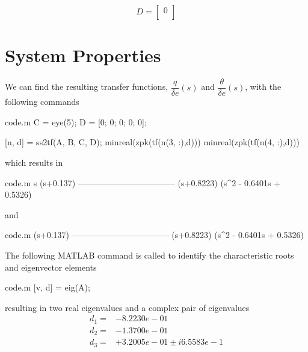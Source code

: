 \documentclass[12pt]{article}
\begin{document}
\begin{equation*}
D =
\begin{bmatrix}
 0 \\
\end{bmatrix}
\end{equation*}

\clearpage
\section{System Properties}

\noindent We can find the resulting transfer functions, $\dfrac{q}{\delta e} (s)$ and $\dfrac{\theta}{\delta e} (s)$, with the following commands \\

\begin{filecontents*}{code.m}
C = eye(5);
D = [0; 0; 0; 0; 0];

[n, d] = ss2tf(A, B, C, D);
minreal(zpk(tf(n(3, :),d))) %
minreal(zpk(tf(n(4, :),d))) %
\end{filecontents*}


\noindent which results in
\begin{filecontents*}{code.m}
              s (s+0.137)
  -----------------------------------
  (s+0.8223) (s^2 - 0.6401s + 0.5326)
\end{filecontents*}

and
\begin{filecontents*}{code.m}
               (s+0.137)
  -----------------------------------
  (s+0.8223) (s^2 - 0.6401s + 0.5326)
 
\end{filecontents*}


\noindent The following MATLAB command is called to identify the characteristic roots and eigenvector elements
\begin{filecontents*}{code.m}
[v, d] = eig(A);
\end{filecontents*}


\noindent resulting in two real eigenvalues and a complex pair of eigenvalues
\begin{equation*}
\begin{split}
d_1 =& -8.2230e-01 \\
d_2 =& -1.3700e-01 \\
d_3 =& +3.2005e-01 \pm i 6.5583e-1 \\
\end{split}
\end{equation*}
\end{document}
